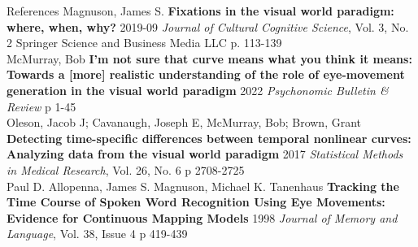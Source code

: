 \documentclass{beamer}
\begin{document}
\begin{frame}{References}\small
Magnuson, James S. \textbf{Fixations in the visual world paradigm: where, when, why?} 2019-09 \textit{Journal of Cultural Cognitive Science}, Vol. 3, No. 2 Springer  Science and Business Media LLC p. 113-139 \newline \\

McMurray, Bob \textbf{I'm not sure that curve means what you think it means: Towards a [more] realistic understanding of the role of eye-movement generation in the visual world paradigm} 2022 \textit{Psychonomic Bulletin \& Review} p 1-45 \newline \\

Oleson, Jacob J; Cavanaugh, Joseph E, McMurray, Bob; Brown, Grant \textbf{Detecting time-specific differences between temporal nonlinear curves: Analyzing data from the visual world paradigm} 2017 \textit{Statistical Methods in Medical Research}, Vol. 26, No. 6 p 2708-2725 \newline \\

Paul D. Allopenna, James S. Magnuson, Michael K. Tanenhaus
\textbf{Tracking the Time Course of Spoken Word Recognition Using Eye Movements: Evidence for Continuous Mapping Models} 1998 \textit{Journal of Memory and Language}, Vol. 38, Issue 4 p 419-439


\end{frame}
\end{document}
